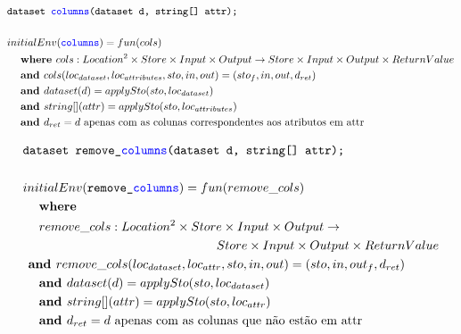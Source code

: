 \documentclass[12pt]{article}
\newcommand{\blu}{\textcolor{blue}}
\begin{document}
\begin{align*}
	&\texttt{dataset \blu{columns}(dataset d, string[] attr);} \\
	\\
&initialEnv(\texttt{\blu{columns}}) = fun(cols) \\
&\hspace{3ex}\textbf{where } cols:Location^2\times Store\times Input\times Output\rightarrow Store\times Input\times Output\times ReturnValue \\
&\hspace{3ex}\textbf{and } cols(loc_{dataset}, loc_{attributes},sto,in,out) = (sto_f,in,out,d_{ret})\\
&\hspace{3ex}\textbf{and } dataset(d) = applySto(sto,loc_{dataset}) \\
&\hspace{3ex}\textbf{and } string[](attr) = applySto(sto,loc_{attributes}) \\
&\hspace{3ex}\textbf{and } d_{ret} =  d \text{ apenas com as colunas correspondentes aos atributos em attr}\\
\end{align*}

\begin{align*}
	&\texttt{dataset remove\_\blu{columns}(dataset d, string[] attr);} \\
	\\
&initialEnv(\texttt{remove\_\blu{columns}}) = fun(remove\_cols) \\
&\hspace{3ex}\textbf{where } \\
&\hspace{3ex} remove\_cols:Location^2\times Store\times Input\times Output\rightarrow \\
&\hspace{36ex}Store\times Input\times Output\times ReturnValue \\
&\hspace{1ex}\textbf{and } remove\_cols(loc_{dataset}, loc_{attr},sto,in,out) = (sto,in,out_f,d_{ret})\\
&\hspace{3ex}\textbf{and } dataset(d) = applySto(sto, loc_{dataset}) \\
&\hspace{3ex}\textbf{and } string[](attr) = applySto(sto, loc_{attr}) \\
&\hspace{3ex}\textbf{and } d_{ret} = d\text{ apenas com as colunas que não estão em attr} \\
\end{align*}
\end{document}
